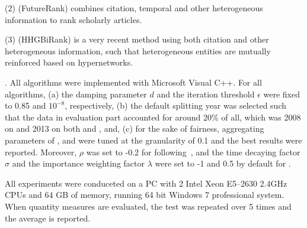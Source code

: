 \noindent
(2) \futurerank (FutureRank) combines citation, temporal and other heterogeneous information to rank scholarly articles.

\noindent
(3) \hhgrank (HHGBiRank) is a very recent method using both citation and other heterogeneous information, such that heterogeneous entities are mutually reinforced based on hypernetworks.


.
All algorithms were implemented with Microsoft Visual C++.
For all algorithms, (a) the damping parameter $d$ and the iteration threshold $\epsilon$ were fixed to 0.85 and $10^{-8}$, respectively,
(b) the default splitting year was selected such that the data in evaluation part accounted for around 20\% of all, which was 2008 on \aan and 2013 on both \aminer and \magdata, and,
(c) for the sake of fairness, aggregating parameters of \futurerank, \hhgrank and \ensemblerank were tuned at the granularity of 0.1 and the best results were reported.
%
Moreover, $\rho$ was set to -0.2 for \futurerank following~\cite{sayyadi09}, and the time decaying factor $\sigma$ and the importance weighting factor $\lambda$ were set to -1 and 0.5  by default for \ensemblerank.

All experiments were conduceted on a PC with 2 Intel Xeon E5--2630 2.4GHz CPUs and 64 GB of memory, running 64 bit Windows 7 professional system. %
When quantity measures are evaluated, the test was repeated over 5 times and the average is reported.


